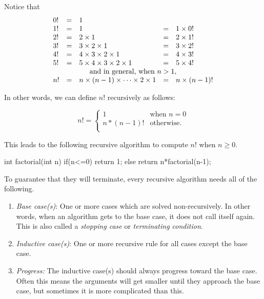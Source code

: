 \begin{exa}\label{exa:factRec}
Notice that 
$$
\begin{array}{lllll}
0!&=&1 \\
1!&=&1 &=& 1 \times 0!\\
2!&=&2 \times 1 &=& 2 \times 1!\\
3!&=&3 \times 2 \times 1 &=& 3\times 2! \\
4!&=&4 \times 3\times 2\times 1 &=& 4\times 3!\\ 
5!&=&5\times 4 \times 3\times 2\times 1 &=& 5\times 4!\\ 
\multicolumn{5}{c}{\mbox{and in general, when } n>1,}\\
n!&=&n \times (n-1)\times\cdots\times 2\times 1 &=& n\times (n-1)!\\ 
\end{array}
$$

In other words, we can define $n!$ recursively as follows:

$$
n! = \left\{ \begin{array}{ll}
1 & \mbox{when $n = 0$}\\
 n * (n-1)! & \mbox{otherwise.}\\
\end{array}
\right.
$$

This leads to the following recursive algorithm to compute $n!$ when $n\geq 0$.

\begin{code}
    int factorial(int n) {
        if(n<=0) {
            return 1;
        } else {
            return n*factorial(n-1);
        }
    }
\end{code} 
\end{exa}

To guarantee that they will terminate, every recursive algorithm needs all
of the following.
\begin{enumerate}
\item
{}
{\em Base case(s)}: One or more cases which are solved non-recursively.  
In other words, when an algorithm gets to the base case, it does not call itself again.
This is also called a {\em stopping case} or {\em terminating condition}.
\item 
{\em Inductive case(s)}: One or more recursive rule for all cases except the base case.
\item
{\em Progress:} The inductive case(s) should always progress toward the base case.
Often this means the arguments will get smaller until they approach the base case,
but sometimes it is more complicated than this.
\end{enumerate}
  
